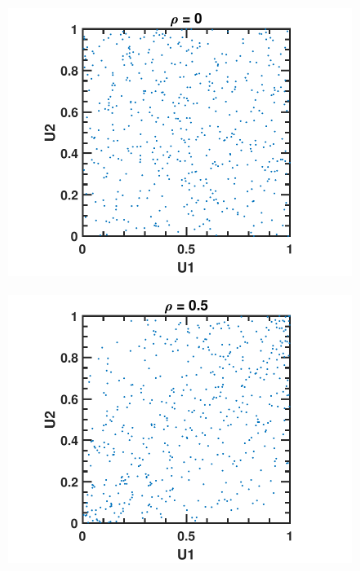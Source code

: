 \begin{refsection}
\begin{figure}[H]
	\centering
	\begin{subfigure}[b]{0.42\textwidth}
		\includegraphics[width=\textwidth]{figures/statisticalModeling/GaussianCopulaDemo1}
			\end{subfigure}\quad
	\begin{subfigure}[b]{0.42\textwidth}
		\includegraphics[width=\textwidth]{figures/statisticalModeling/GaussianCopulaDemo2}
	\end{subfigure}\quad
	\begin{subfigure}[b]{0.42\textwidth}

\end{subfigure}
\end{figure}
\end{refsection}

